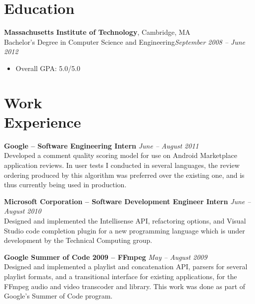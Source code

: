 \documentclass[margin,line]{resume}
\begin{document}
\begin{resume}

\section{\mysidestyle Education}

\textbf{Massachusetts Institute of Technology}, Cambridge, MA \vspace{0mm}\\\vspace{1mm}%
Bachelor's Degree in Computer Science and Engineering\hfill \textsl{September 2008 -- June 2012}\vspace{-0.8mm}
\begin{itemize}
\item Overall GPA: 5.0/5.0 \\
\end{itemize}

\vspace{-6.5mm}

\section{\mysidestyle Work\\Experience}

\textbf{Google -- Software Engineering Intern} \hfill \textsl{June -- August 2011}\\
Developed a comment quality scoring model for use on Android Marketplace application reviews.
In user tests I conducted in several languages, the review ordering produced by this algorithm
was preferred over the existing one, and is thus currently being used in production.

\textbf{Microsoft Corporation -- Software Development Engineer Intern} \hfill \textsl{June -- August 2010}\\
Designed and implemented the Intellisense API, refactoring options, and Visual Studio code completion plugin for a new programming language which is under development by the Technical Computing group.

\textbf{Google Summer of Code 2009 -- FFmpeg} \hfill \textsl{May -- August 2009}\\
Designed and implemented a playlist and concatenation API, parsers for several playlist formats, and a transitional interface for existing applications, for the FFmpeg audio and video transcoder and library. This work was done as part of Google's Summer of Code program.


\end{resume}
\end{document}
